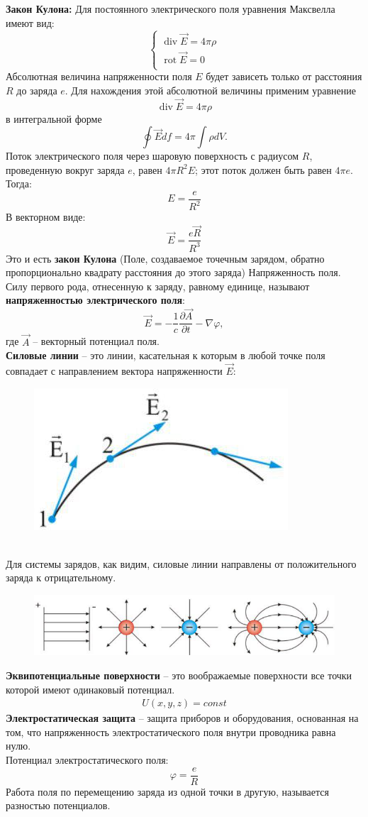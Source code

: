 \documentclass[__minimum__.tex]{subfiles}
\begin{document}
\textbf{Закон Кулона:} Для постоянного электрического поля уравнения Максвелла имеют вид:
$$
\begin{cases}
\operatorname{div}\vec{E} = 4 \pi \rho\\
\operatorname{rot}\vec{E} = 0\\
\end{cases}
$$
Абсолютная величина напряженности поля $E$ будет зависеть только от расстояния $R$ до заряда $e$. Для нахождения этой абсолютной величины применим уравнение
$$
    \operatorname{div}\vec{E}=4\pi\rho
$$
в интегральной форме
$$
    \oint\vec{E}df=4\pi\int\rho dV.
$$
Поток электрического поля через шаровую поверхность с радиусом $R$, проведенную вокруг заряда $e$, равен $4\pi R^2 E$; этот поток должен быть равен $4\pi e$. Тогда:
$$
    E=\frac{e}{R^2}
$$
В векторном виде:
$$
    \vec{E}=\frac{e \vec{R}}{R^3}
$$
Это и есть \textbf{закон Кулона} (Поле, создаваемое точечным зарядом, обратно пропорционально квадрату расстояния до этого заряда)
Напряженность поля.\\

Силу первого рода, отнесенную к заряду, равному единице, называют \textbf{напряженностью электрического поля}:\\
$$
    \vec{E} = -\frac{1}{c}\frac{\partial \vec{A}}{\partial t}-\nabla\varphi,
$$
где $\vec{A}$ -- векторный потенциал поля.\\
\textbf{Силовые линии} -- это линии, касательная к которым в любой точке поля совпадает с направлением вектора напряженности $\vec{E}$:
\begin{figure}[h]
\centering
\includegraphics[width=.4\linewidth]{img/С-03_1.jpg}
\end{figure}\\
Для системы зарядов, как видим, силовые линии направлены от положительного заряда к отрицательному.\\
\begin{figure}[h]
\centering
\includegraphics[width=.4\linewidth]{img/С-03_2.jpg}
\end{figure}
\textbf{Эквипотенциальные поверхности} -- это воображаемые поверхности все точки которой имеют одинаковый потенциал.\\
\begin{gather*}
    U(x,y,z) = const
\end{gather*}
\textbf{Электростатическая защита} -- защита приборов и оборудования, основанная на том, что напряженность электростатического поля внутри проводника равна нулю.\\
Потенциал электростатического поля:
$$
    \varphi=\frac{e}{R}
$$
Работа поля по перемещению заряда из одной точки в другую, называется разностью потенциалов.\\
\end{document}
